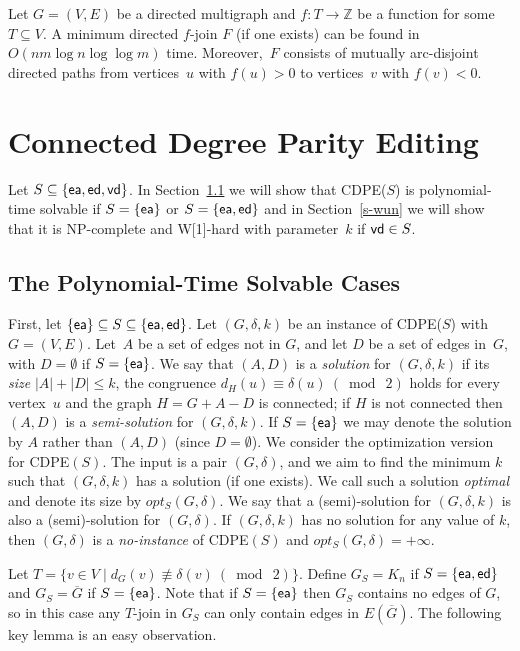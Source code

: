 \documentclass[11pt]{llncs}
\newcommand{\opts}{opt_S}
\newcommand{\vd}{{\sf vd}}
\newcommand{\ed}{{\sf ed}}
\newcommand{\ea}{{\sf ea}}
\newcommand{\cdpe}{{\sc CDPE}}
\newcommand{\NP}{{\sf NP}}
\newcommand{\W}{{\sf W[1]}}
\begin{document}
\begin{lemma}\label{lem:dir-t-join}
Let $G=(V,E)$ be a directed multigraph and $f: T \rightarrow \mathbb{Z}$ be  a
function for some $T\subseteq V$.  A minimum directed $f$-join $F$ (if one
exists) can be found in $O(nm\log n \log \log m)$ time. Moreover,~$F$ consists
of mutually arc-disjoint directed paths from vertices~$u$ with $f(u)>0$ to
vertices~$v$ with $f(v)<0$.
\end{lemma}




\section{Connected Degree Parity Editing}\label{sec:undirected}

Let $S\subseteq \{\ea,\ed,\vd\}$.  
In Section~\ref{s-polyun} we will show that
\cdpe($S$) is polynomial-time solvable if $S=\{\ea\}$ or $S=\{\ea,\ed\}$ and
in Section~\ref{s-wun} we will show 
that it is \NP-complete and \W-hard with parameter~$k$ if $\vd\in S$.

\subsection{The Polynomial-Time Solvable Cases}\label{s-polyun}
First, let $\{\ea\}\subseteq S \subseteq \{\ea,\ed\}$.  Let $(G,\delta,k)$ be an
instance of \cdpe($S$) with $G=(V,E)$.  Let~$A$ be a set of edges not in $G$,
and let $D$ be a set of edges in~$G$, with $D=\emptyset$ if $S=\{\ea\}$.  We
say that $(A,D)$ is a {\em solution} for $(G,\delta,k)$ if its {\em size}
$|A|+|D|\leq k$, the congruence $d_H(u)\equiv\delta(u)~(\bmod~2)$ holds for every vertex~$u$ and
the graph $H=G+A-D$ is connected; if $H$ is
not connected then $(A,D)$ is a {\em semi-solution} for $(G,\delta,k)$. If
$S=\{\ea\}$ we may denote the solution by $A$ rather than $(A,D)$ (since
$D=\emptyset$).  We consider the optimization version for \cdpe$(S)$.  The
input is a pair $(G,\delta)$, and we aim to find the minimum $k$ such that
$(G,\delta,k)$ has a solution (if one exists).  We call such a solution {\em
optimal} and denote its size by $\opts(G,\delta)$.  We say that a
(semi)-solution for $(G,\delta,k)$ is also a (semi)-solution for $(G,\delta)$.
If $(G,\delta,k)$ has no solution for any value of $k$, then $(G,\delta)$ is a
{\em no-instance} of  \cdpe$(S)$ and $\opts(G,\delta)=+\infty$.

Let $T=\{v\in V\;|\;d_G(v)\not\equiv \delta(v)~(\bmod~2)\}$.  Define
$G_S=K_n$ if $S=\{\ea,\ed\}$ and $G_S=\overline{G}$ if $S=\{\ea\}$.  Note that
if $S=\{\ea\}$ then $G_S$ contains no edges of $G$, so in this case any
$T$-join in $G_S$ can only contain edges in $E(\overline{G})$. The following
key lemma is an easy observation.
\end{document}
